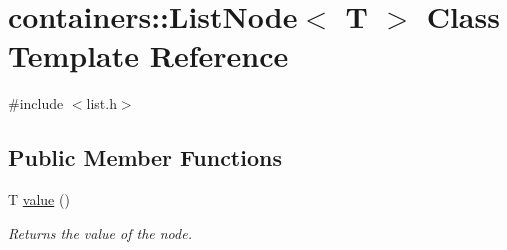 \hypertarget{classcontainers_1_1_list_node}{}\section{containers\+:\+:List\+Node$<$ T $>$ Class Template Reference}
\label{classcontainers_1_1_list_node}


{\ttfamily \#include $<$list.\+h$>$}

\subsection*{Public Member Functions}
\begin{DoxyCompactItemize}
\item 
\mbox{\label{classcontainers_1_1_list_node_a9cf1141134fc49b33f4a1787f6fd2d4d}} 
T \hyperlink{classcontainers_1_1_list_node_a9cf1141134fc49b33f4a1787f6fd2d4d}{value} ()
\begin{DoxyCompactList}\small\item\em Returns the value of the node. \end{DoxyCompactList}\end{DoxyCompactItemize}
